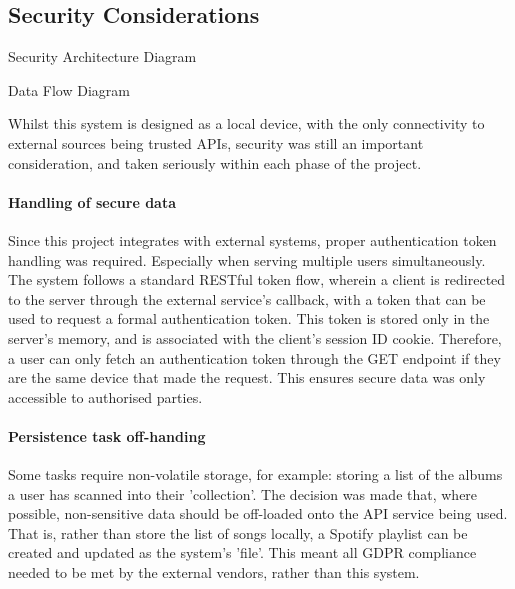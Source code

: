         \subsection{Security Considerations} \label{sec:security}
    
            \begin{temp}
                Security Architecture Diagram
            \end{temp}
    
            \begin{temp}
                Data Flow Diagram
            \end{temp}
    
            Whilst this system is designed as a local device, with the only connectivity to external sources being trusted APIs, security was still an important consideration, and taken seriously within each phase of the project.
    
            \paragraph{Handling of secure data} Since this project integrates with external systems, proper authentication token handling was required. Especially when serving multiple users simultaneously. The system follows a standard RESTful token flow, wherein a client is redirected to the server through the external service's callback, with a token that can be used to request a formal authentication token. This token is stored only in the server's memory, and is associated with the client's session ID cookie. Therefore, a user can only fetch an authentication token through the GET endpoint if they are the same device that made the request. This ensures secure data was only accessible to authorised parties.
    
            \paragraph{Persistence task off-handing} Some tasks require non-volatile storage, for example: storing a list of the albums a user has scanned into their 'collection'. The decision was made that, where possible, non-sensitive data should be off-loaded onto the API service being used. That is, rather than store the list of songs locally, a Spotify playlist can be created and updated as the system's 'file'. This meant all GDPR compliance needed to be met by the external vendors, rather than this system.
    
